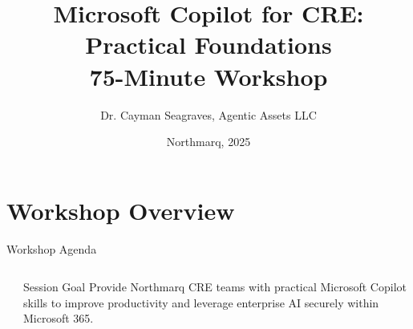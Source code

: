\documentclass{beamer}
\author{Dr. Cayman Seagraves, Agentic Assets LLC}
\date{Northmarq, 2025}
\title{Microsoft Copilot for CRE: Practical Foundations \\ 75-Minute Workshop\\}
\begin{document}
{
\begin{frame}
    \titlepage
\end{frame}
}

\section{Workshop Overview}

\begin{frame}{Workshop Agenda}
    \begin{columns}[c]
        \begin{column}{0.45\textwidth}
            \centering
            \large
            \setlength{\itemsep}{1em}
            \tableofcontents
        \end{column}
        \begin{column}{0.45\textwidth}
            \centering
            \begin{block}{Session Goal}
                \normalsize
                Provide Northmarq CRE teams with practical Microsoft Copilot skills to improve productivity and leverage enterprise AI securely within Microsoft 365.
            \end{block}
        \end{column}
    \end{columns}
\end{frame}
\end{document}
